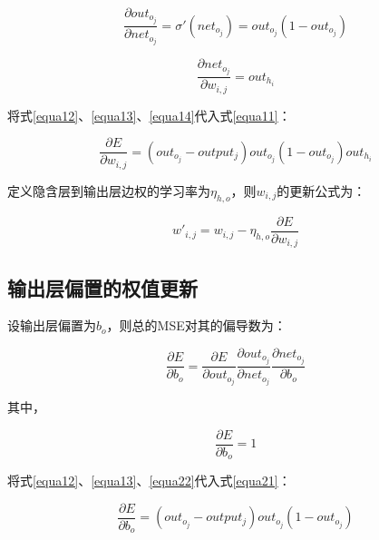 \documentclass[forprint]{WHUBachelor}
\begin{document}
      \begin{equation}
        \frac{\partial{out_{o_j}}}{\partial{net_{o_j}}}
        =\sigma'(net_{o_j})
        =out_{o_j}(1-out_{o_j})
        \label{equa13}
      \end{equation}

      \begin{equation}
        \frac{\partial{net_{o_j}}}{\partial{w_{i,j}}}
        =out_{h_i}
        \label{equa14}
      \end{equation}

      将式\ref{equa12}、\ref{equa13}、\ref{equa14}代入式\ref{equa11}：
      
      \begin{equation}
        \frac{\partial{E}}{\partial{w_{i,j}}}=
        (out_{o_j}-output_j)out_{o_j}(1-out_{o_j})out_{h_i}
      \end{equation}

      定义隐含层到输出层边权的学习率为$\eta_{h,o}$，则$w_{i,j}$的更新公式为：

      \begin{equation}
        w'_{i,j}=w_{i,j}-\eta_{h,o}\frac{\partial{E}}{\partial{w_{i,j}}}
      \end{equation}
    
    \subsection{输出层偏置的权值更新}
      设输出层偏置为$b_o$，则总的MSE对其的偏导数为：

      \begin{equation}
        \frac{\partial{E}}{\partial{b_o}}=
        \frac{\partial{E}}{\partial{out_{o_j}}}
        \frac{\partial{out_{o_j}}}{\partial{net_{o_j}}}
        \frac{\partial{net_{o_j}}}{\partial{b_o}}
        \label{equa21}
      \end{equation}

      其中，

      \begin{equation}
        \frac{\partial{E}}{\partial{b_o}}=1
        \label{equa22}
      \end{equation}

      将式\ref{equa12}、\ref{equa13}、\ref{equa22}代入式\ref{equa21}：
      
      \begin{equation}
        \frac{\partial{E}}{\partial{b_o}}=
        (out_{o_j}-output_j)out_{o_j}(1-out_{o_j})
      \end{equation}
\end{document}
